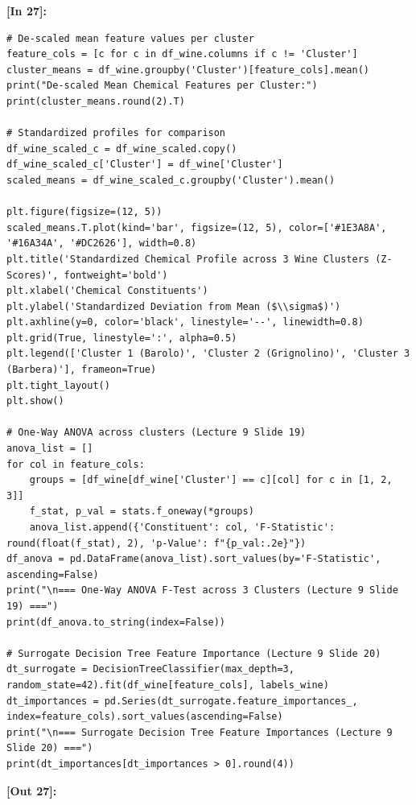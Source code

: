 \vspace{0.4em}
\noindent\textbf{\small [In 27]:}
\begin{lstlisting}[style=pycode]
# De-scaled mean feature values per cluster
feature_cols = [c for c in df_wine.columns if c != 'Cluster']
cluster_means = df_wine.groupby('Cluster')[feature_cols].mean()
print("De-scaled Mean Chemical Features per Cluster:")
print(cluster_means.round(2).T)

# Standardized profiles for comparison
df_wine_scaled_c = df_wine_scaled.copy()
df_wine_scaled_c['Cluster'] = df_wine['Cluster']
scaled_means = df_wine_scaled_c.groupby('Cluster').mean()

plt.figure(figsize=(12, 5))
scaled_means.T.plot(kind='bar', figsize=(12, 5), color=['#1E3A8A', '#16A34A', '#DC2626'], width=0.8)
plt.title('Standardized Chemical Profile across 3 Wine Clusters (Z-Scores)', fontweight='bold')
plt.xlabel('Chemical Constituents')
plt.ylabel('Standardized Deviation from Mean ($\\sigma$)')
plt.axhline(y=0, color='black', linestyle='--', linewidth=0.8)
plt.grid(True, linestyle=':', alpha=0.5)
plt.legend(['Cluster 1 (Barolo)', 'Cluster 2 (Grignolino)', 'Cluster 3 (Barbera)'], frameon=True)
plt.tight_layout()
plt.show()

# One-Way ANOVA across clusters (Lecture 9 Slide 19)
anova_list = []
for col in feature_cols:
    groups = [df_wine[df_wine['Cluster'] == c][col] for c in [1, 2, 3]]
    f_stat, p_val = stats.f_oneway(*groups)
    anova_list.append({'Constituent': col, 'F-Statistic': round(float(f_stat), 2), 'p-Value': f"{p_val:.2e}"})
df_anova = pd.DataFrame(anova_list).sort_values(by='F-Statistic', ascending=False)
print("\n=== One-Way ANOVA F-Test across 3 Clusters (Lecture 9 Slide 19) ===")
print(df_anova.to_string(index=False))

# Surrogate Decision Tree Feature Importance (Lecture 9 Slide 20)
dt_surrogate = DecisionTreeClassifier(max_depth=3, random_state=42).fit(df_wine[feature_cols], labels_wine)
dt_importances = pd.Series(dt_surrogate.feature_importances_, index=feature_cols).sort_values(ascending=False)
print("\n=== Surrogate Decision Tree Feature Importances (Lecture 9 Slide 20) ===")
print(dt_importances[dt_importances > 0].round(4))
\end{lstlisting}
\noindent\textbf{\small [Out 27]:}
